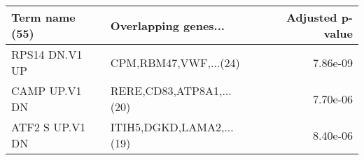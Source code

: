 \begin{tabular}{llr}
\toprule
 Term name (55) &     Overlapping genes... &  Adjusted p-value \\
\midrule
 RPS14 DN.V1 UP &    CPM,RBM47,VWF,...(24) &          7.86e-09 \\
  CAMP UP.V1 DN & RERE,CD83,ATP8A1,...(20) &          7.70e-06 \\
ATF2 S UP.V1 DN & ITIH5,DGKD,LAMA2,...(19) &          8.40e-06 \\
\bottomrule
\end{tabular}
